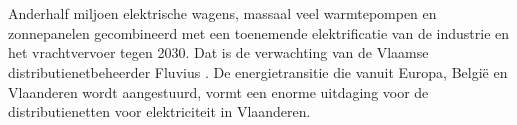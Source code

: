 
\chapter{}%
\label{ch:inleiding}



\section{}%
\label{sec:probleemstelling}


Anderhalf miljoen elektrische wagens, massaal veel warmtepompen en zonnepanelen gecombineerd met een toenemende elektrificatie van de industrie en het vrachtvervoer tegen 2030. Dat is de verwachting van de Vlaamse distributienetbeheerder Fluvius \autocite{Verdoodt2022}. De energietransitie die vanuit Europa, België en Vlaanderen wordt aangestuurd, vormt een enorme uitdaging voor de distributienetten voor elektriciteit in Vlaanderen. \\

